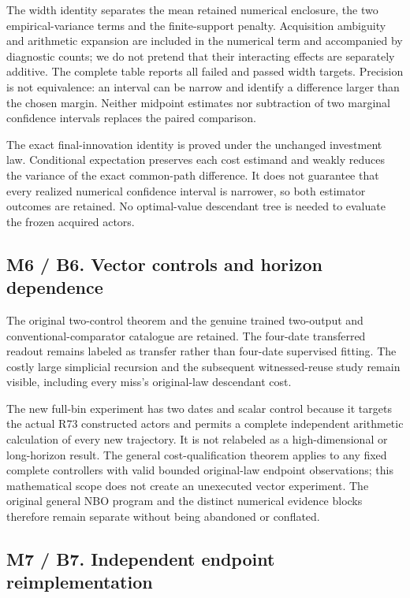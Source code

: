 \documentclass[ecta,nameyear,draft]{econsocart}
\begin{document}
The width identity separates the mean retained numerical enclosure, the
two empirical-variance terms and the finite-support penalty. Acquisition
ambiguity and arithmetic expansion are included in the numerical term
and accompanied by diagnostic counts; we do not pretend that their
interacting effects are separately additive. The complete table reports
all failed and passed width targets. Precision is not equivalence: an
interval can be narrow and identify a difference larger than the chosen
margin. Neither midpoint estimates nor subtraction of two marginal
confidence intervals replaces the paired comparison.

The exact final-innovation identity is proved under the unchanged
investment law. Conditional expectation preserves each cost estimand and
weakly reduces the variance of the exact common-path difference. It does
not guarantee that every realized numerical confidence interval is
narrower, so both estimator outcomes are retained. No optimal-value
descendant tree is needed to evaluate the frozen acquired actors.

\hypertarget{m6-b6.-vector-controls-and-horizon-dependence}{%
\subsection{M6 / B6. Vector controls and horizon
dependence}\label{m6-b6.-vector-controls-and-horizon-dependence}}

The original two-control theorem and the genuine trained two-output and
conventional-comparator catalogue are retained. The four-date
transferred readout remains labeled as transfer rather than four-date
supervised fitting. The costly large simplicial recursion and the
subsequent witnessed-reuse study remain visible, including every miss's
original-law descendant cost.

The new full-bin experiment has two dates and scalar control because it
targets the actual R73 constructed actors and permits a complete
independent arithmetic calculation of every new trajectory. It is not
relabeled as a high-dimensional or long-horizon result. The general
cost-qualification theorem applies to any fixed complete controllers
with valid bounded original-law endpoint observations; this mathematical
scope does not create an unexecuted vector experiment. The original
general NBO program and the distinct numerical evidence blocks therefore
remain separate without being abandoned or conflated.

\hypertarget{m7-b7.-independent-endpoint-reimplementation}{%
\subsection{M7 / B7. Independent endpoint
reimplementation}\label{m7-b7.-independent-endpoint-reimplementation}}
\end{document}
